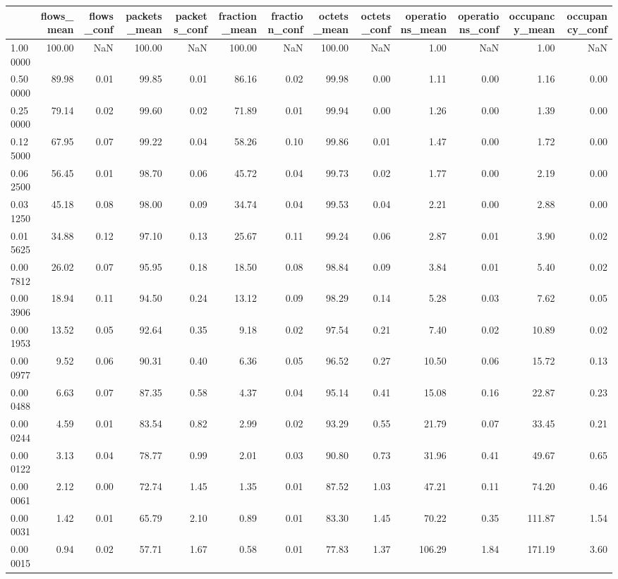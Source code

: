 \begin{tabular}{lrrrrrrrrrrrr}
\toprule
 & flows_mean & flows_conf & packets_mean & packets_conf & fraction_mean & fraction_conf & octets_mean & octets_conf & operations_mean & operations_conf & occupancy_mean & occupancy_conf \\
\midrule
1.000000 & 100.00 & NaN & 100.00 & NaN & 100.00 & NaN & 100.00 & NaN & 1.00 & NaN & 1.00 & NaN \\
0.500000 & 89.98 & 0.01 & 99.85 & 0.01 & 86.16 & 0.02 & 99.98 & 0.00 & 1.11 & 0.00 & 1.16 & 0.00 \\
0.250000 & 79.14 & 0.02 & 99.60 & 0.02 & 71.89 & 0.01 & 99.94 & 0.00 & 1.26 & 0.00 & 1.39 & 0.00 \\
0.125000 & 67.95 & 0.07 & 99.22 & 0.04 & 58.26 & 0.10 & 99.86 & 0.01 & 1.47 & 0.00 & 1.72 & 0.00 \\
0.062500 & 56.45 & 0.01 & 98.70 & 0.06 & 45.72 & 0.04 & 99.73 & 0.02 & 1.77 & 0.00 & 2.19 & 0.00 \\
0.031250 & 45.18 & 0.08 & 98.00 & 0.09 & 34.74 & 0.04 & 99.53 & 0.04 & 2.21 & 0.00 & 2.88 & 0.00 \\
0.015625 & 34.88 & 0.12 & 97.10 & 0.13 & 25.67 & 0.11 & 99.24 & 0.06 & 2.87 & 0.01 & 3.90 & 0.02 \\
0.007812 & 26.02 & 0.07 & 95.95 & 0.18 & 18.50 & 0.08 & 98.84 & 0.09 & 3.84 & 0.01 & 5.40 & 0.02 \\
0.003906 & 18.94 & 0.11 & 94.50 & 0.24 & 13.12 & 0.09 & 98.29 & 0.14 & 5.28 & 0.03 & 7.62 & 0.05 \\
0.001953 & 13.52 & 0.05 & 92.64 & 0.35 & 9.18 & 0.02 & 97.54 & 0.21 & 7.40 & 0.02 & 10.89 & 0.02 \\
0.000977 & 9.52 & 0.06 & 90.31 & 0.40 & 6.36 & 0.05 & 96.52 & 0.27 & 10.50 & 0.06 & 15.72 & 0.13 \\
0.000488 & 6.63 & 0.07 & 87.35 & 0.58 & 4.37 & 0.04 & 95.14 & 0.41 & 15.08 & 0.16 & 22.87 & 0.23 \\
0.000244 & 4.59 & 0.01 & 83.54 & 0.82 & 2.99 & 0.02 & 93.29 & 0.55 & 21.79 & 0.07 & 33.45 & 0.21 \\
0.000122 & 3.13 & 0.04 & 78.77 & 0.99 & 2.01 & 0.03 & 90.80 & 0.73 & 31.96 & 0.41 & 49.67 & 0.65 \\
0.000061 & 2.12 & 0.00 & 72.74 & 1.45 & 1.35 & 0.01 & 87.52 & 1.03 & 47.21 & 0.11 & 74.20 & 0.46 \\
0.000031 & 1.42 & 0.01 & 65.79 & 2.10 & 0.89 & 0.01 & 83.30 & 1.45 & 70.22 & 0.35 & 111.87 & 1.54 \\
0.000015 & 0.94 & 0.02 & 57.71 & 1.67 & 0.58 & 0.01 & 77.83 & 1.37 & 106.29 & 1.84 & 171.19 & 3.60 \\

\end{tabular}
